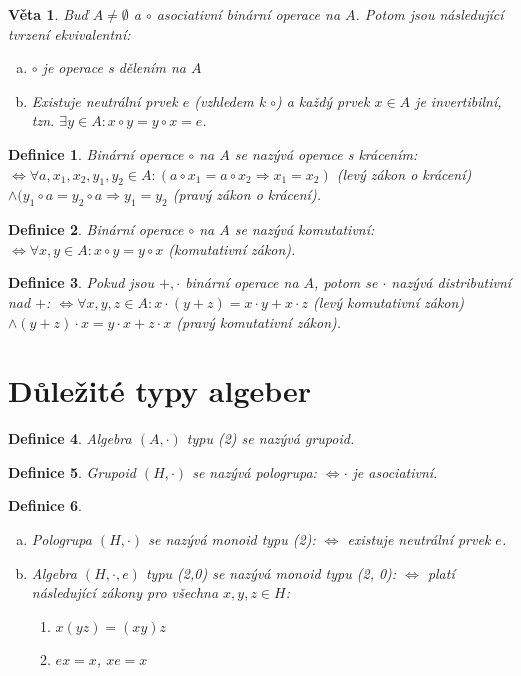 \documentclass[a4paper, 11pt]{report}
\newtheorem{mydef}{Definice}[chapter]
\newtheorem{veta}{Věta}
\begin{document}
\begin{veta}
Buď $A \not= \emptyset$ a $\circ$ asociativní binární operace na $A$. Potom jsou následující tvrzení ekvivalentní:
\begin{enumerate}[a)]
	\item $\circ$ je operace s dělením na $A$
	\item Existuje neutrální prvek $e$ (vzhledem k $\circ$) a každý prvek $x \in A$ je invertibilní, tzn. $\exists y \in A: x \circ y = y \circ x = e$.
\end{enumerate}
\end{veta}

\begin{mydef}
Binární operace $\circ$ na $A$ se nazývá operace s krácením: $\Leftrightarrow \forall a, x_1, x_2, y_1, y_2 \in A: (a \circ x_1 = a \circ x_2 \Rightarrow x_1 = x_2)$ (levý zákon o krácení) $\land (y_1 \circ a = y_2 \circ a \Rightarrow y_1 = y_2$ (pravý zákon o krácení).
\end{mydef}

\begin{mydef}
Binární operace $\circ$ na $A$ se nazývá komutativní: $\Leftrightarrow \forall x,y \in A: x \circ y = y \circ x$ (komutativní zákon).
\end{mydef}

\begin{mydef}
Pokud jsou $+, \cdot$ binární operace na $A$, potom se $\cdot$ nazývá distributivní nad $+$: $\Leftrightarrow \forall x,y,z \in A: x \cdot (y + z) = x \cdot y + x \cdot z$ (levý komutativní zákon) $\land (y + z) \cdot x = y \cdot x + z \cdot x$ (pravý komutativní zákon).
\end{mydef}

\section{Důležité typy algeber}
\begin{mydef}
Algebra $(A, \cdot)$ typu (2) se nazývá \emph{grupoid}.
\end{mydef}

\begin{mydef}
Grupoid $(H, \cdot)$ se nazývá \emph{pologrupa}: $\Leftrightarrow \cdot$ je asociativní.
\end{mydef}

\begin{mydef}
\begin{enumerate}[a)]
	\item Pologrupa $(H, \cdot)$ se nazývá \emph{monoid} typu (2): $\Leftrightarrow$ existuje neutrální prvek $e$.
	\item Algebra $(H, \cdot, e)$ typu (2,0) se nazývá \emph{monoid} typu (2, 0): $\Leftrightarrow$ platí následující zákony pro všechna $x,y,z \in H$:
	\begin{enumerate}[1)]
		\item $x(yz) = (xy)z$
		\item $ex = x$, $xe = x$
	\end{enumerate}
\end{enumerate}
\end{mydef}
\end{document}
